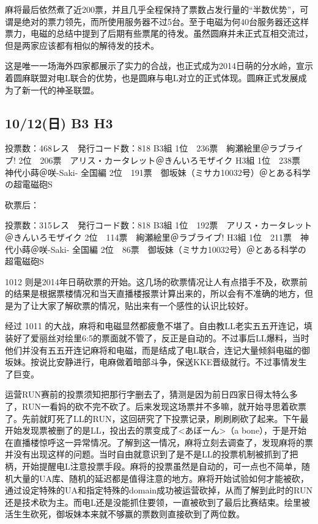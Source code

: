 麻将最后依然煮了近200票，并且几乎全程保持了票数占发行量的“半数优势”，可谓是绝对的票力领先，而所使用服务器不过5台。至于电磁为何40台服务器还这样票力，电磁的总结中提到了后期有些票尾的待发。虽然圆麻并未正式互相交流过，但是两家应该都有相似的解待发的技术。

这是唯一一场海外四家都展示了实力的合战，也正式成为2014日萌的分水岭，宣示着圆麻联盟对电L联合的优势，也是圆麻与电L对立的正式体现。圆麻正式发展成为了新一代的神圣联盟。

\subsection{10/12(日) B3 H3}

	投票数：468レス　発行コード数：818
	B3組
	1位　236票　絢瀬絵里＠ラブライブ!
	2位　206票　アリス・カータレット＠きんいろモザイク
	H3組
	1位　238票　神代小蒔＠咲-Saki- 全国編
	2位　191票　御坂妹（ミサカ10032号）＠とある科学の超電磁砲S

砍票后：

	投票数：315レス　発行コード数：818
	B3組
	1位　192票　アリス・カータレット＠きんいろモザイク
	2位　114票　絢瀬絵里＠ラブライブ!
	H3組
	1位　211票　神代小蒔＠咲-Saki- 全国編
	2位　86票　御坂妹（ミサカ10032号）＠とある科学の超電磁砲S

1012 则是2014年日萌砍票的开始。这几场的砍票情况让人有点措手不及，砍票前的结果是根据票楼情况和当天直播楼报票计算出来的，所以会有不准确的地方，但是为了让大家了解砍票的情况，贴出来有一个感性的认识比较好。

经过 1011 的大战，麻将和电磁显然都疲惫不堪了。自由教LL老实五五开连记，填装好了爱丽丝对绘里6:5的票面就不管了，反正是自动的。不过事后LL爆料，当时他们并没有五五开连记麻将和电磁，而是结成了电L联合，连记大量倾斜电磁的御坂妹。按说比安静进行，电麻做着暗部斗争，保送KKE晋级就行。不过事情发生了巨变。

运营RUN赛前的投票须知把那行字删去了，猜测是因为前日四家日得太特么多了，RUN一看妈的砍不完不砍了。后来发现这场票并不多嘛，就开始寻思着砍票了。先前就盯死了LL的RUN，这回研究了下投票记录，刷刷刷砍了起来。下午最开始发现票被删了的是LL，投出去的票变成了<あぼーん>（a bone），于是开始在直播楼惊呼这一异常情况。了解到这一情况，麻将立刻去调查了，发现麻将的票并没有出现这样的问题。当时自由就意识到了是不是LL的投票机制被抓到了把柄，开始提醒电L注意投票手段。麻将的投票虽然是自动的，可一点也不简单，随机大量的UA库、随机的延迟都是值得注意的地方。麻将开始试验如何才能被砍，通过设定特殊的UA和指定特殊的domain成功被运营砍掉，从而了解到此时的RUN还是技术砍为主。而电L还是没能抓住要领，一直被砍到了最后比赛结束。绘里被活生生砍死，御坂妹本来就不够赢的票数则直接砍到了两位数。

